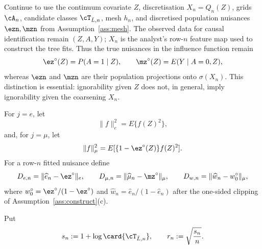Continue to use the continuum covariate $Z$, discretisation
$X_n=Q_n(Z)$, grids $\cA_n$, candidate classes
$\cT_{\bar L,n}$, mesh $h_n$, and discretised population nuisances
$\ezn,\mzn$ from Assumption~\ref{ass:mesh}.  The observed data for causal
identification remain $(Z,A,Y)$; $X_n$ is the analyst's row-$n$ feature map
used to construct the tree fits.  Thus the true nuisances in the influence
function remain
\[
  \ez^\circ(Z)=P(A=1\mid Z),
  \qquad
  \mz^\circ(Z)=E(Y\mid A=0,Z),
\]
whereas $\ezn$ and $\mzn$ are their population projections onto
$\sigma(X_n)$.  This distinction is essential: ignorability given $Z$ does
not, in general, imply ignorability given the coarsening $X_n$.

For $j=e$, let
\[
  \|f\|_e^2=E\{f(Z)^2\},
\]
and, for $j=\mu$, let
\[
  \|f\|_\mu^2
  =E[\{1-\ez^\circ(Z)\}f(Z)^2].
\]
For a row-$n$ fitted nuisance define
\[
  D_{e,n}=\|\widehat e_n-\ez^\circ\|_e,
  \qquad
  D_{\mu,n}=\|\widehat\mu_n-\mz^\circ\|_\mu,
  \qquad
  D_{w,n}=\|\widehat w_n-w_0^\circ\|_\mu,
\]
where $w_0^\circ=\ez^\circ/(1-\ez^\circ)$ and
$\widehat w_n=\widehat e_n/(1-\widehat e_n)$ after the one-sided clipping of
Assumption~\ref{ass:construct}(c).

Put
\[
  s_n:=1+\log\card{\cT_{\bar L,n}},
  \qquad
  r_n:=\sqrt{\frac{s_n}{n}}.
\]

